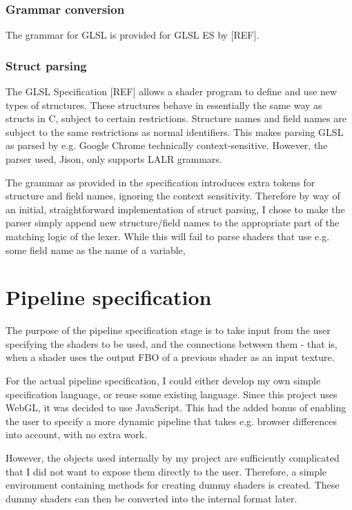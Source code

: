 \documentclass[12pt,twoside,notitlepage]{report}
\begin{document}
\subsubsection{Grammar conversion}
The grammar for GLSL is provided for GLSL ES by [REF]. 

\subsubsection{Struct parsing}
The GLSL Specification [REF] allows a shader program to define and use new types of structures. These structures behave in essentially the same way as structs in C, subject to certain restrictions. Structure names and field names are subject to the same restrictions as normal identifiers. This makes parsing GLSL as parsed by e.g. Google Chrome technically context-sensitive. However, the parser used, Jison, only supports LALR grammars.

The grammar as provided in the specification introduces extra tokens for structure and field names, ignoring the context sensitivity. Therefore by way of an initial, straightforward implementation of struct parsing, I chose to make the parser simply append new structure/field names to the appropriate part of the matching logic of the lexer. While this will fail to parse shaders that use e.g. some field name as the name of a variable, 

\section{Pipeline specification}
The purpose of the pipeline specification stage is to take input from the user specifying the shaders to be used, and the connections between them - that is, when a shader uses the output FBO of a previous shader as an input texture.

For the actual pipeline specification, I could either develop my own simple specification language, or reuse some existing language. Since this project uses WebGL, it was decided to use JavaScript. This had the added bonus of enabling the user to specify a more dynamic pipeline that takes e.g. browser differences into account, with no extra work.

However, the objects used internally by my project are sufficiently complicated that I did not want to expose them directly to the user. Therefore, a simple environment containing methods for creating dummy shaders is created. These dummy shaders can then be converted into the internal format later.
\end{document}
